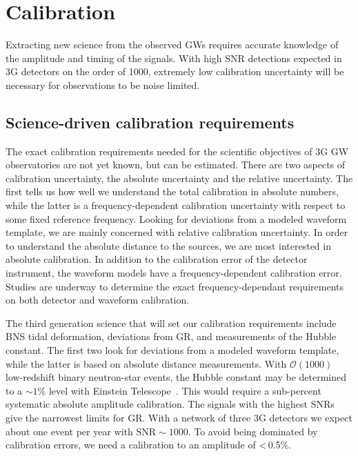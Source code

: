 \chapter{Calibration}
\label{sec:Calibration}

Extracting new science from the observed GWs requires accurate knowledge of the amplitude and timing of the signals. With high SNR detections expected in 3G detectors on the order of 1000, extremely low calibration uncertainty will be necessary for observations to be noise limited.

\section{Science-driven calibration requirements}
The exact calibration requirements needed for the scientific objectives of 3G GW observatories are not yet known, but can be estimated. There are two aspects of calibration uncertainty, the absolute uncertainty and the relative uncertainty. The first tells us how well we understand the total calibration in absolute numbers, while the latter is a frequency-dependent calibration uncertainty with respect to some fixed reference frequency. 
Looking for deviations from a modeled waveform template, we are mainly concerned with relative calibration uncertainty. In order to understand the absolute distance to the sources, we are most interested in absolute calibration. In addition to the calibration error of the detector instrument, the waveform models have a frequency-dependent calibration error. Studies are underway to determine the exact frequency-dependant requirements on both detector and waveform calibration.

The third generation science that will set our calibration requirements include BNS tidal deformation, deviations from GR, and measurements of the Hubble constant. The first two look for deviations from a modeled waveform template, while the latter is based on absolute distance measurements. With $\mathcal{O}(1000)$ low-redshift binary neutron-star events, the Hubble constant may be determined to a ${\sim}1\%$ level with Einstein Telescope~\cite{Cai:2016sby}.
This would require a sub-percent systematic absolute amplitude calibration.
The signals with the highest SNRs give the narrowest limits for GR. With a network of three 3G detectors we expect about one event per year with $\text{SNR} \sim 1000$. To avoid being dominated by calibration errors, we need a calibration to an amplitude of <\,0.5\%.

